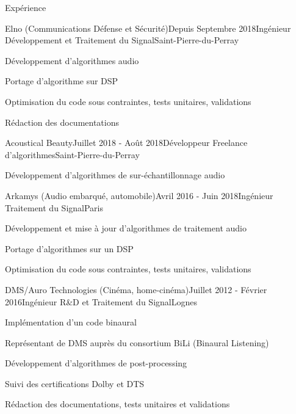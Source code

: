 \documentclass{resume} %
\begin{document}
	
\begin{rSection}{Expérience}

\begin{rSubsection}{Elno (Communications Défense et Sécurité)}{Depuis Septembre 2018}{Ingénieur Développement et Traitement du Signal}{Saint-Pierre-du-Perray}
\item Développement d'algorithmes audio
\item Portage d'algorithme sur DSP
\item Optimisation du code sous contraintes, tests unitaires, validations
\item Rédaction des documentations
\end{rSubsection}


\begin{rSubsection}{Acoustical Beauty}{Juillet 2018 - Août 2018}{Développeur Freelance d'algorithmes}{Saint-Pierre-du-Perray}
\item Développement d'algorithmes de sur-échantillonnage audio
\end{rSubsection}


\begin{rSubsection}{Arkamys (Audio embarqué, automobile)}{Avril 2016 - Juin 2018}{Ingénieur Traitement du Signal}{Paris}
\item Développement et mise à jour d'algorithmes de traitement audio
\item Portage d'algorithmes sur un DSP
\item Optimisation du code sous contraintes, tests unitaires, validations
\end{rSubsection}


\begin{rSubsection}{DMS/Auro Technologies (Cinéma, home-cinéma)}{Juillet 2012 - Février 2016}{Ingénieur R\&D et Traitement du Signal}{Lognes}
\item Implémentation d'un code binaural
\item Représentant de DMS auprès du consortium BiLi (Binaural Listening)
\item Développement d'algorithmes de post-processing
\item Suivi des certifications Dolby et DTS
\item Rédaction des documentations, tests unitaires et validations
\end{rSubsection}


\end{rSection}
\end{document}
